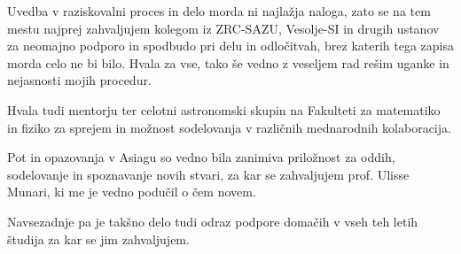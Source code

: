 Uvedba v raziskovalni proces in delo morda ni najlažja naloga, zato se na tem mestu najprej zahvaljujem kolegom iz ZRC-SAZU, Vesolje-SI in drugih ustanov za neomajno podporo in spodbudo pri delu in odločitvah, brez katerih tega zapisa morda celo ne bi bilo. Hvala za vse, tako še vedno z veseljem rad rešim uganke in nejasnosti mojih procedur. 

Hvala tudi mentorju ter celotni astronomski skupin na Fakulteti za matematiko in fiziko za sprejem in možnost sodelovanja v različnih mednarodnih kolaboracija. 

Pot in opazovanja v Asiagu so vedno bila zanimiva priložnost za oddih, sodelovanje in spoznavanje novih stvari, za kar se zahvaljujem prof. Ulisse Munari, ki me je vedno podučil o čem novem.

Navsezadnje pa je takšno delo tudi odraz podpore domačih v vseh teh letih študija za kar se jim zahvaljujem.